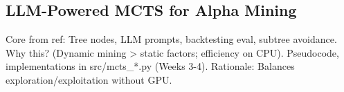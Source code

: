 \subsection{LLM-Powered MCTS for Alpha Mining}
\label{sec:mcts}

Core from ref: Tree nodes, LLM prompts, backtesting eval, subtree avoidance. Why this? (Dynamic mining > static factors; efficiency on CPU). Pseudocode, implementations in src/mcts\_*.py (Weeks 3-4). Rationale: Balances exploration/exploitation without GPU.